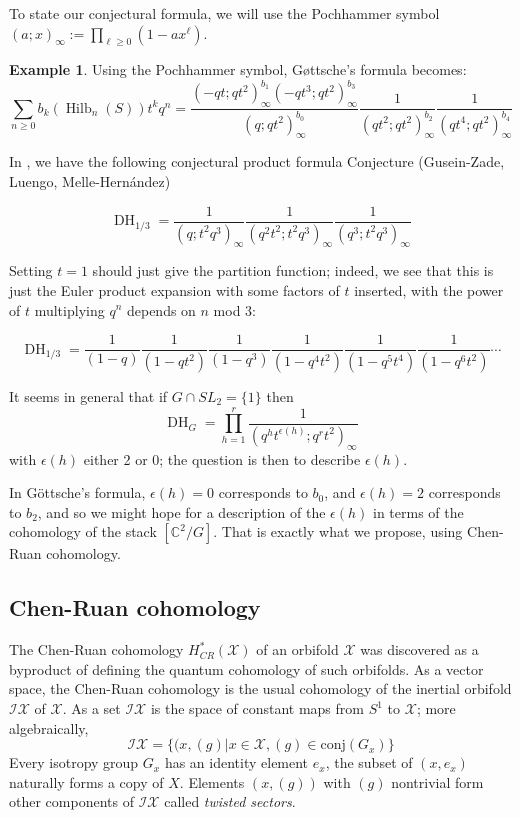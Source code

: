 \documentclass{amsart}[12pt]
\theoremstyle{definition}
\newtheorem{example}[dummy]{Example}
\newcommand{\C}{\mathbb{C}}
\DeclareMathOperator{\Hilb}{Hilb}
\DeclareMathOperator{\DC}{DH}
\begin{document}
To state our conjectural formula, we will use the Pochhammer symbol $(a;x)_\infty:=\prod_{\ell\geq 0} (1-ax^\ell)$.
\begin{example}
Using the Pochhammer symbol, G\o ttsche's formula becomes:
$$\sum_{n\geq 0} b_k(\Hilb_n(S))t^kq^n=
\frac{(-qt;qt^2)_\infty^{b_1}(-qt^3;qt^2)_\infty^{b_3}}{(q;qt^2)_\infty^{b_0}}\frac{1}{(qt^2;qt^2)_\infty^{b_2}}\frac{1}{(qt^4;qt^2)_\infty^{b_4}}$$
\end{example}

In \cite{GLMequivariant}, we have the following conjectural product formula 
{Conjecture (Gusein-Zade, Luengo, Melle-Hern\'andez)}

$$\DC_{1/3}=\frac{1}{(q;t^2q^3)_\infty}\frac{1}{(q^2t^2;t^2q^3)_\infty}\frac{1}{(q^3;t^2q^3)_\infty}$$

Setting $t=1$ should just give the partition function; indeed, we see that this is just the Euler product expansion with some factors of $t$ inserted, with the power of $t$ multiplying $q^n$ depends on $n$ mod 3:

$$\DC_{1/3}=\frac{1}{(1-q)}\frac{1}{(1-qt^2)}\frac{1}{(1-q^3)}\frac{1}{(1-q^4t^2)}
\frac{1}{(1-q^5t^4)}\frac{1}{(1-q^6t^2)}\cdots$$

 It seems in general that if $G\cap SL_2=\{1\}$ then
$$\DC_{G}=\prod_{h=1}^r \frac{1}{(q^h t^{\epsilon(h)}; q^r t^2)_\infty}$$
with $\epsilon(h)$ either 2 or 0; the question is then to describe $\epsilon(h)$.

In G\"ottsche's formula, $\epsilon(h)=0$ corresponds to $b_0$, and $\epsilon(h)=2$ corresponds to $b_2$, and so we might hope for a description of the $\epsilon(h)$ in terms of the cohomology of the stack $[\C^2/G]$.  That is exactly what we propose, using Chen-Ruan cohomology.



\subsection{Chen-Ruan cohomology}

The Chen-Ruan cohomology $H_{CR}^*(\mathcal{X})$ of an orbifold $\mathcal{X}$ was discovered as a byproduct of defining the quantum cohomology of such orbifolds.  As a vector space, the Chen-Ruan cohomology is the usual cohomology of the inertial orbifold $\mathcal{IX}$ of $\mathcal{X}$.  As a set $\mathcal{IX}$ is the space of constant maps from $S^1$ to $\mathcal{X}$; more algebraically, 
$$\mathcal{IX}=\{(x, (g)| x\in \mathcal{X}, (g)\in\textrm{conj}(G_x)\}$$
Every isotropy group $G_x$ has an identity element $e_x$, the subset of $(x, e_x)$ naturally forms a copy of $X$.  Elements $(x,(g))$ with $(g)$ nontrivial form other components of $\mathcal{IX}$ called \emph{twisted sectors}.
\end{document}
